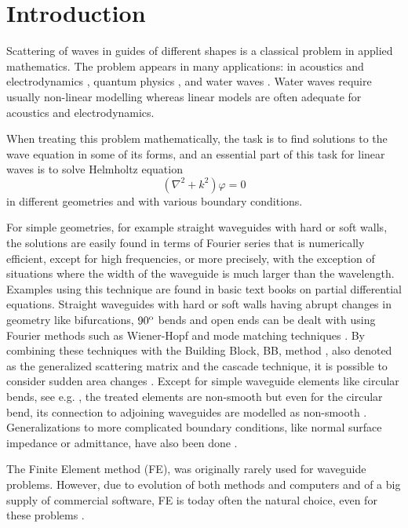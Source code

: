 \documentclass[numreferences]{kluwer}
\renewcommand{\phi}{\varphi}
\begin{document}
\section{Introduction}
\label{sec:intro}

Scattering of waves in guides of different shapes is a classical
problem in applied mathematics. The problem appears in many
applications: in acoustics and electrodynamics
\cite{jones1986,jin:2010}, quantum physics
\cite{londegan+carini+murdock:1999}, and water waves
\cite{abbott:1956,aimen+michelle+theodore:1998}. Water waves require
usually non-linear modelling whereas linear models are often adequate
for acoustics and electrodynamics.

When treating this problem mathematically, the task is to find
solutions to the wave equation in some of its forms, and an essential
part of this task for linear waves is to solve Helmholtz equation
\begin{equation}
  \label{eq:Helmholtz1}
  (\nabla^2+k^2)\phi=0
\end{equation}
in different geometries and with various boundary conditions.

For simple geometries, for example straight waveguides with hard or
soft walls, the solutions are easily found in terms of Fourier series
that is numerically efficient, except for high frequencies, or more
precisely, with the exception of situations where the width of the
waveguide is much larger than the wavelength. Examples using this
technique are found in basic text books on partial differential
equations. Straight waveguides with hard or soft walls having abrupt
changes in geometry like bifurcations, $90^{\tiny{\rm o}}$ bends and
open ends can be dealt with using Fourier methods such as Wiener-Hopf
and mode matching techniques \cite{mittralee1971}. By combining these
techniques with the Building Block, BB, method
\cite{nilssonbrander1981b}, also denoted as the generalized scattering
matrix \cite{mittralee1971} and the cascade \cite{jones1986}
technique, it is possible to consider sudden area changes
\cite{mittralee1971,nilssonbrander1981b}. Except for simple waveguide
elements like circular bends, see e.g. \cite{bironilsson2005}, the
treated elements are non-smooth but even for the circular bend, its
connection to adjoining waveguides are modelled as non-smooth
\cite{bironilsson2005}. Generalizations to more complicated boundary
conditions, like normal surface impedance or admittance, have also
been done \cite{buyukaksoycinar2005}.

The Finite Element method (FE), was originally rarely used for
waveguide problems. However, due to evolution of both methods and
computers and of a big supply of commercial software, FE is today often
the natural choice, even for these problems
\cite{zienkiewicz+taylor+zhu:2008,Ihlenburg:1998}.
\end{document}
